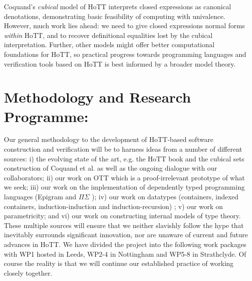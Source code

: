 \documentclass[a4paper,11pt]{article}
\begin{document}

Coquand's \emph{cubical} model of HoTT interprets closed expressions
as canonical denotations, demonstrating basic feasibility of computing
with univalence. However, much work lies ahead: we need to give
closed expressions normal forms \emph{within} HoTT, and to recover
definitional equalities lost by the cubical interpretation. Further, other models might
offer better computational foundations for HoTT, so practical progress
towards programming languages and verification tools based on HoTT
is best informed by a broader model theory.










\section{Methodology and Research Programme:}



Our general methodology to the development of HoTT-based software
construction and verification will be to harness ideas from a number
of different sources: i) the evolving state of the art, e.g. the HoTT
book and the cubical sets construction of Coquand et al. as well as
the ongoing dialogue with our collaborators; ii) our work on OTT which
is a proof-irrelevant prototype of what we seek; iii) our work on the
implementation of dependently typed programming languages (Epigram and
$\Pi\Sigma$ \cite{alti:pisigma-new,alti:checking}); iv) our work on datatypes (containers, indexed
containers, induction-induction and induction-recursion) 
\cite{alti:fossacs03,alti:tlca03,alti:icalp04,alti:jpartial,alti:mpc04,alti:cont-tcs,alti:regular,alti:cats07,alti:jcats07,alti:lics09,
alti:catind2}
 ; v) our work
on parametricity; and vi) our work on constructing internal models of
type theory. These multiple sources will ensure that we neither
slavishly follow the hype that inevitably surrounds significant
innovation, nor are unaware of current and future advances in HoTT. We
have divided the project into the following work packages with WP1
hosted in Leeds, WP2-4 in Nottingham and WP5-8 in Strathclyde. Of course
the reality is that we will continue our established practice of
working closely together.
\end{document}
